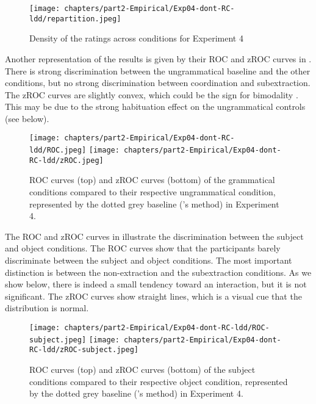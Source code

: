\begin{figure}
    \centering
    \texttt{[image: chapters/part2-Empirical/Exp04-dont-RC-ldd/repartition.jpeg]}
    \caption{Density of the ratings across conditions for Experiment 4}
    \label{fig:exp04-repartition}
\end{figure}

Another representation of the results is given by their ROC and zROC curves in . There is strong discrimination between the ungrammatical baseline and the other conditions, but no strong discrimination between coordination and subextraction. The zROC curves are slightly convex, which could be the sign for bimodality \citep[21--22]{Dillon.2019}. This may be due to the strong habituation effect on the ungrammatical controls (see below).

\begin{figure}
    \centering
    \texttt{[image: chapters/part2-Empirical/Exp04-dont-RC-ldd/ROC.jpeg]}
    \texttt{[image: chapters/part2-Empirical/Exp04-dont-RC-ldd/zROC.jpeg]}
    \caption{ROC curves (top) and zROC curves (bottom) of the grammatical conditions compared to their respective ungrammatical condition, represented by the dotted grey baseline (\citealt{Dillon.2019}'s method) in Experiment 4.}
    \label{fig:exp04-ROC}
\end{figure}

The ROC and zROC curves in  illustrate the discrimination between the subject and object conditions. The ROC curves show that the participants barely discriminate between the subject and object conditions. The most important distinction is between the non-extraction and the subextraction conditions. As we show below, there is indeed a small tendency toward an interaction, but it is not significant. The zROC curves show straight lines, which is a visual cue that the distribution is normal.

\begin{figure}
    \centering
    \texttt{[image: chapters/part2-Empirical/Exp04-dont-RC-ldd/ROC-subject.jpeg]}
    \texttt{[image: chapters/part2-Empirical/Exp04-dont-RC-ldd/zROC-subject.jpeg]}
    \caption{ROC curves (top) and zROC curves (bottom) of the subject conditions compared to their respective object condition, represented by the dotted grey baseline (\citealt{Dillon.2019}'s method) in Experiment 4.}
    \label{fig:exp04-ROC-subj}
\end{figure}

